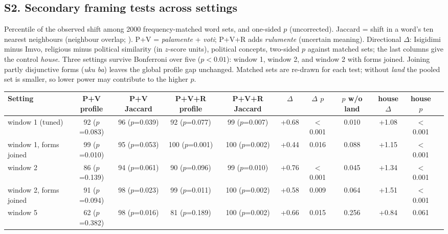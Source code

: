 \subsection*{S2. Secondary framing tests across settings}
Percentile of the observed shift among 2000 frequency-matched word sets, and one-sided $p$ (uncorrected). Jaccard = shift in a word's ten nearest neighbours (neighbour overlap; \citealp{gonen2020}). P+V = \emph{palamente} + \emph{voti}; P+V+R adds \emph{rulumente} (uncertain meaning). Directional $\Delta$: Isigidimi minus Imvo, religious minus political similarity (in $z$-score units), political concepts, two-sided $p$ against matched sets; the last columns give the control \emph{house}. Three settings survive Bonferroni over five ($p<0.01$): window 1, window 2, and window 2 with forms joined. Joining partly disjunctive forms (\emph{uku ba}) leaves the global profile gap unchanged. Matched sets are re-drawn for each test; without \emph{land} the pooled set is smaller, so lower power may contribute to the higher $p$.\\[2pt]
\begin{tabular}{@{}lcccccccccc@{}}
\toprule
Setting & P+V profile & P+V Jaccard & P+V+R profile & P+V+R Jaccard & $\Delta$ & $\Delta$ $p$ & $p$ w/o land & house $\Delta$ & house $p$ \\ \midrule
window 1 (tuned) & 92 ($p$=0.083) & 96 ($p$=0.039) & 92 ($p$=0.077) & 99 ($p$=0.007) & +0.68 & $<$0.001 & 0.010 & +1.08 & $<$0.001 \\
window 1, forms joined & 99 ($p$=0.010) & 95 ($p$=0.053) & 100 ($p$=0.001) & 100 ($p$=0.002) & +0.44 & 0.016 & 0.088 & +1.15 & $<$0.001 \\
window 2 & 86 ($p$=0.139) & 94 ($p$=0.061) & 90 ($p$=0.096) & 99 ($p$=0.010) & +0.76 & $<$0.001 & 0.045 & +1.34 & $<$0.001 \\
window 2, forms joined & 91 ($p$=0.094) & 98 ($p$=0.023) & 99 ($p$=0.011) & 100 ($p$=0.002) & +0.58 & 0.009 & 0.064 & +1.51 & $<$0.001 \\
window 5 & 62 ($p$=0.382) & 98 ($p$=0.016) & 81 ($p$=0.189) & 100 ($p$=0.002) & +0.66 & 0.015 & 0.256 & +0.84 & 0.061 \\
\bottomrule
\end{tabular}

